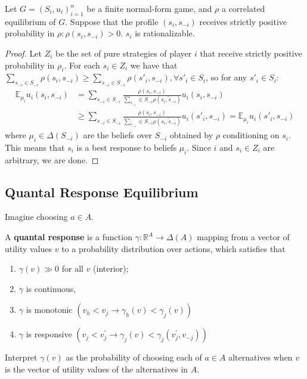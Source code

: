 \documentclass[11pt]{elegantbook}
\begin{document}
\begin{proposition}
    Let $G = (S_i, u_i)_{i=1}^n$ be a finite normal-form game, and $\rho$ a correlated equilibrium of $G$. Suppose that the profile $(s_i, s_{-i})$ receives strictly positive probability in $\rho: \rho(s_i, s_{-i}) > 0$. $s_i$ is rationalizable.
\end{proposition}
\begin{proof}
    Let $Z_i$ be the set of pure strategies of player $i$ that receive strictly positive probability in $\rho_i$. For each $s_i \in Z_i$ we have that $\sum_{s_{-i}\in S_{-i}} \rho(s_i, s_{-i}) \geq \sum_{s_{-i}\in S_{-i}} \rho(s'_i, s_{-i}),\forall s'_i\in S_i$, so for any $s'_i\in S_i$:
    \begin{equation}
        \begin{aligned}
            \mathbb{E}_{\mu_i}u_i(s_i,s_{-i})&=\sum_{s_{-i}\in S_{-i}}\frac{\rho(s_i, s_{-i})}{\sum_{\tilde{s}_{-i}}\in S_{-i}\rho(s_i,\tilde{s}_{-i})}u_i(s_i,s_{-i})\\
            &\geq \sum_{s_{-i}\in S_{-i}}\frac{\rho(s_i, s_{-i})}{\sum_{\tilde{s}_{-i}}\in S_{-i}\rho(s_i,\tilde{s}_{-i})}u_i(s'_i,s_{-i})=\mathbb{E}_{\mu_i}u_i(s'_i,s_{-i})
        \end{aligned}
        \nonumber
    \end{equation}
    where $\mu_{i}\in\Delta(S_{-i})$ are the beliefs over $S_{-i}$ obtained by $\rho$ conditioning on $s_i$. This means that $s_i$ is a best response to beliefs $\mu_i$. Since $i$ and $s_i\in Z_i$ are arbitrary, we are done.
\end{proof}


\subsection{Quantal Response Equilibrium}
Imagine choosing $a \in A$.
\begin{definition}
    \normalfont
    A \textbf{quantal response} is a function $\gamma: \mathbb{R}^A \rightarrow \Delta(A)$ mapping from a vector of utility values $v$ to a probability distribution over actions, which satisfies that
    \begin{enumerate}[$\circ$]
        \item $\gamma(v) \gg 0$ for all $v$ (interior);
        \item $\gamma$ is continuous,
        \item $\gamma$ is monotonic $\left(v_h<v_j \rightarrow \gamma_h(v)<\gamma_j(v)\right)$
        \item $\gamma$ is responsive $\left(v_j<v_j^{\prime} \rightarrow \gamma_j(v)<\gamma_j\left(v_j^{\prime}, v_{-j}\right)\right)$
    \end{enumerate}
\end{definition}
Interpret $\gamma(v)$ as the probability of choosing each of $a \in A$ alternatives when $v$ is the vector of utility values of the alternatives in $A$.
\end{document}
